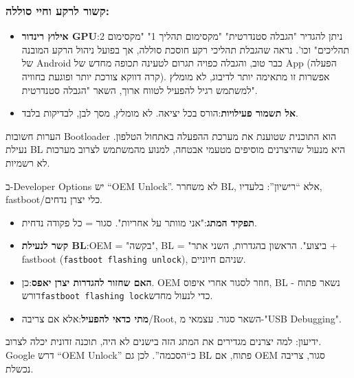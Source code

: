 \subsubsection*{קשור לרקע וחיי סוללה:}

\begin{itemize}
  \item \textbf{אילוץ רינדור GPU}:ניתן להגדיר "הגבלה סטנדרטית" "מקסימום תהליך 1" "מקסימום 2 תהליכים" וכו'. נראה שהגבלת תהליכי רקע חוסכת סוללה, אך בפועל ניהול הרקע המובנה של Android כבר טוב, והגבלה כפויה תגרום לטעינה תכופה מחדש של App (הפעלה קרה דווקא צורכת יותר ופוגעת בחוויה). אפשרות זו מתאימה יותר לדיבוג, לא מומלץ למשתמש רגיל להפעיל לטווח ארוך, השאר "הגבלה סטנדרטית".
  \item \textbf{אל תשמור פעילויות}:הורס בכל יציאה. לא מומלץ, מסך לבן, לבדיקות בלבד.
\end{itemize}

\begin{tcbwarn}{הערות חשובות}
Bootloader הוא התוכנית שטוענת את מערכת ההפעלה באתחול הטלפון. נעילת BL היא מנעול שהיצרנים מוסיפים מטעמי אבטחה, למנוע מהמשתמש לצרוב מערכות לא רשמיות.

\end{tcbwarn}


ב-Developer Options יש “OEM Unlock”. לא משחרר BL, אלא “רישיון”: בלעדיו, fastboot/כלי יצרן נדחים.

\begin{itemize}
  \item \textbf{תפקיד המתג}:"אני מוותר על אחריות". סגור = כל פקודה נדחית.
  \item \textbf{קשר לנעילת BL}:OEM = "בקשה", BL = "ביצוע". הראשון בהגדרות, השני אתר + fastboot (\texttt{fastboot flashing unlock}), שניהם חיוניים.
  \item \textbf{האם שחזור להגדרות יצרן יאפס}:כן. OEM חוזר לסגור אחרי איפוס, BL נשאר פתוח - דורש\texttt{fastboot flashing lock}כדי לנעול מחדש.
  \item \textbf{מתי כדאי להפעיל}:אלא אם צריבה/Root, השאר סגור. עצמאי מ-"USB Debugging".
\end{itemize}

\begin{tcbinfo}{ידיעון: למה יצרנים מגדירים את המתג הזה}
בישנים לא היה, תוכנה זדונית יכלה לצרוב. Google דרש “OEM Unlock” כ“הסכמה”. לכן גם BL פתוח, אם OEM סגור, צריבה נכשלת.

\end{tcbinfo}

